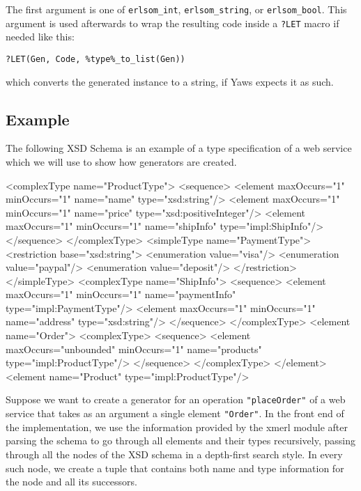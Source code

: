\documentclass[submission,copyright]{eptcs}
\newcommand{\LET}{\texttt{?LET}\xspace}
\begin{document}
The first argument is one of \texttt{erlsom\_int},
\texttt{erlsom\_string}, or \texttt{erlsom\_bool}. This argument is
used afterwards to wrap the resulting code inside a \LET macro if
needed like this:

\begin{center}
  \texttt{?LET(Gen, Code, \%type\%\_to\_list(Gen))}
\end{center}
which converts the generated instance to a string, if Yaws expects it as such.

\subsection{Example}

The following XSD Schema is an example of a type specification of a web service 
which we will use to show how generators are created.

\begin{lstxsd}
  <complexType name="ProductType">
    <sequence>
      <element maxOccurs="1" minOccurs="1" name="name" type="xsd:string"/>
      <element maxOccurs="1" minOccurs="1" name="price" type="xsd:positiveInteger"/>
      <element maxOccurs="1" minOccurs="1" name="shipInfo" type="impl:ShipInfo"/>
    </sequence>
  </complexType>
  <simpleType name="PaymentType">
    <restriction base="xsd:string">
      <enumeration value="visa"/>
      <enumeration value="paypal"/>
      <enumeration value="deposit"/>
    </restriction>
  </simpleType>
  <complexType name="ShipInfo">
    <sequence>
      <element maxOccurs="1" minOccurs="1" name="paymentInfo" type="impl:PaymentType"/>
      <element maxOccurs="1" minOccurs="1" name="address" type="xsd:string"/>
    </sequence>
  </complexType>
  <element name="Order">
    <complexType>
      <sequence>
        <element maxOccurs="unbounded" minOccurs="1" name="products" type="impl:ProductType"/>
      </sequence>
    </complexType>
  </element>
  <element name="Product" type="impl:ProductType"/>
\end{lstxsd}


Suppose we want to create a generator for an operation
\texttt{"placeOrder"} of a web service that takes as an argument a
single element \texttt{"Order"}. In the front end of the
implementation, we use the information provided by the xmerl module
after parsing the schema to go through all elements and their types
recursively, passing through all the nodes of the XSD schema in a
depth-first search style. In every such node, we create a tuple that
contains both name and type information for the node and all its
successors.
\end{document}
